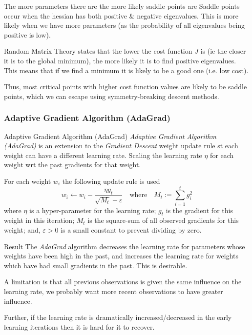 \documentclass[11pt,a4paper]{article}
\begin{document}
  \begin{remark}{The more parameters there are the more likely saddle points are}
    Saddle points occur when the hessian has both positive \& negative eigenvalues. This is more likely when we have more parameters (as the probability of all eigenvalues being positive is low).
    \par Random Matrix Theory states that the lower the cost function $J$ is (ie the closer it is to the global minimum), the more likely it is to find positive eigenvalues. This means that if we find a minimum it is likely to be a good one (i.e. low cost).
    \par Thus, most critical points with higher cost function values are likely to be saddle points, which we can escape using symmetry-breaking descent methods.
  \end{remark}

\subsubsection{Adaptive Gradient Algorithm (AdaGrad)} \label{sec_AdaGrad}

  \begin{definition}{Adaptive Gradient Algorithm (AdaGrad)}
    \textit{Adaptive Gradient Algorithm (AdaGrad)} is an extension to the \textit{Gradient Descent} weight update rule st each weight can have a different learning rate. Scaling the learning rate $\eta$ for each weight wrt the past gradients for that weight.
    \par For each weight $w_i$ the following update rule is used
    \[
      w_i\leftarrow w_i-\frac{\eta g_t}{\sqrt{M_t}+\varepsilon}\quad\text{where}\quad M_t:=\sum_{i=1}^t g_i^2
    \]
    where $\eta$ is a hyper-parameter for the learning rate; $g_t$ is the gradient for this weight in this iteration; $M_t$ is the square-sum of all observed gradients for this weight; and, $\varepsilon>0$ is a small constant to prevent dividing by zero.
  \end{definition}

  \begin{remark}{Result}
    The \textit{AdaGrad} algorithm decreases the learning rate for parameters whose weights have been high in the past, and increases the learning rate for weights which have had small gradients in the past. This is desirable.
    \par A limitation is that all previous observations is given the same influence on the learning rate, we probably want more recent observations to have greater influence.
    \par Further, if the learning rate is dramatically increased/decreased in the early learning iterations then it is hard for it to recover.
  \end{remark}
\end{document}
